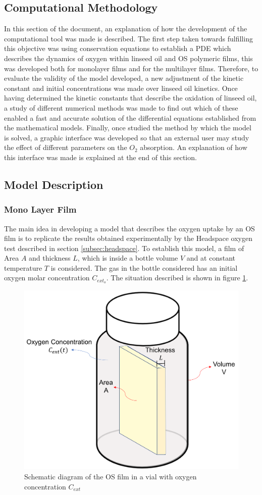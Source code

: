 \begin{refsection}
\section{Computational Methodology}\label{sec:computational methodology}
In this section of the document, an explanation of how the development of the computational tool was made is described. The first step taken towards fulfilling this objective was using conservation equations to establish a PDE which describes the dynamics of oxygen within linseed oil and OS polymeric films, this was developed both for monolayer films and for the multilayer films. Therefore, to evaluate the validity of the model developed, a new adjustment of the kinetic constant and initial concentrations was made over linseed oil kinetics. Once having determined the kinetic constants that describe the oxidation of linseed oil, a study of different numerical methods was made to find out which of these enabled a fast and accurate solution of the differential equations established from the mathematical models. Finally, once studied the method by which the model is solved, a graphic interface was developed so that an external user may study the effect of different parameters on the $O_2$ absorption. An explanation of how this interface was made is explained at the end of this section. 

\subsection{Model Description}\label{subsec:model_desc.}

\subsubsection{Mono Layer Film}
The main idea in developing a model that describes the oxygen uptake by an OS film is to replicate the results obtained experimentally by the Headspace oxygen test described in section \ref{subsec:headspace}. To establish this model, a film of Area $A$ and thickness $L$, which is inside a bottle volume $V$ and at constant temperature $T$ is considered. The gas in the bottle considered has an initial oxygen molar concentration $C_{ext_o}$. The situation described is shown in figure \ref{fig:model_diagram}. 

\begin{figure}[ht]
    \centering
    \includegraphics[width=0.5\linewidth]{Documento_Latex/Tesis_1/Imagenes/modelo.png}
    \caption{Schematic diagram of the OS film in a vial with oxygen concentration $C_{ext}$}
    \label{fig:model_diagram}
\end{figure}


\end{refsection}
